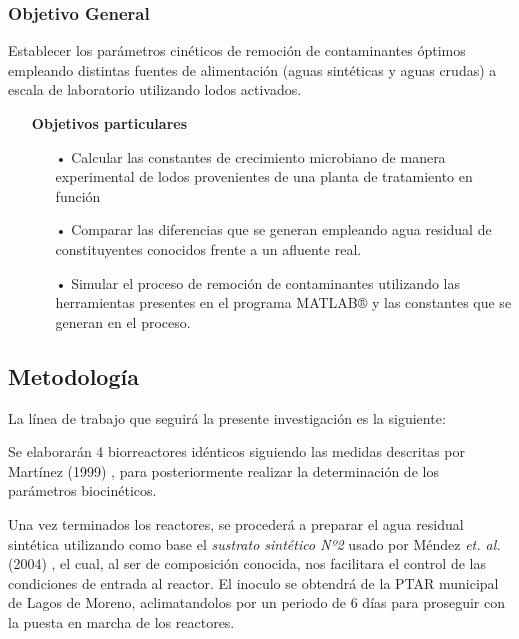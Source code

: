 \subsubsection*{Objetivo General}
Establecer los parámetros cinéticos de remoción de contaminantes óptimos empleando distintas fuentes de alimentación (aguas sintéticas y aguas crudas) a escala de laboratorio utilizando lodos activados.
	\begin{itemize}
		\item[] \textbf{Objetivos particulares}
			\begin{itemize}
				\item[•] Calcular las constantes de crecimiento microbiano de manera experimental de lodos provenientes de una planta de tratamiento en función
				\item[•] Comparar las diferencias que se generan empleando agua residual de constituyentes conocidos frente a un afluente real.
				\item[•]	Simular el proceso de remoción de contaminantes utilizando las herramientas presentes en el programa MATLAB® y las constantes que se generan en el proceso.
			\end{itemize}
	\end{itemize}
\subsection*{Metodología}
La línea de trabajo que seguirá la presente investigación es la siguiente:\par
Se elaborarán 4 biorreactores idénticos siguiendo las medidas descritas por Martínez (1999) \emph{\citep{delgadillo}}, para posteriormente realizar la determinación de los parámetros biocinéticos.\par
Una vez terminados los reactores, se procederá a preparar el agua residual sintética utilizando como base el \emph{sustrato sintético Nº2} usado por Méndez \textit{et. al.} (2004) \emph{\citep{mendez2004}}, el cual, al ser de composición conocida, nos facilitara el control de las condiciones de entrada al reactor. El inoculo se obtendrá de la PTAR municipal de Lagos de Moreno, aclimatandolos por un periodo de 6 días para proseguir con la puesta en marcha de los reactores.\par

